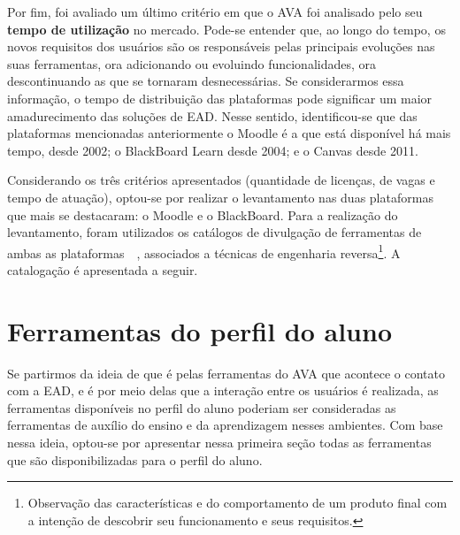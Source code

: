 
Por fim, foi avaliado um último critério em que o AVA foi analisado pelo seu \textbf{tempo de utilização} no mercado. Pode-se entender que, ao longo do tempo, os novos requisitos dos usuários são os responsáveis pelas principais evoluções nas suas ferramentas, ora adicionando ou evoluindo funcionalidades, ora descontinuando as que se tornaram desnecessárias. Se considerarmos essa informação, o tempo de distribuição das plataformas pode significar um maior amadurecimento das soluções de EAD. Nesse sentido, identificou-se que das plataformas mencionadas anteriormente o Moodle é a que está disponível há mais tempo, desde 2002; o BlackBoard Learn desde 2004; e o Canvas desde 2011.

Considerando os três critérios apresentados (quantidade de licenças, de vagas e tempo de atuação), optou-se por realizar o levantamento nas duas plataformas que mais se destacaram: o Moodle e o BlackBoard. Para a realização do levantamento, foram utilizados os catálogos de divulgação de ferramentas de ambas as plataformas~\cite{moodle}~\cite{bblearn}, associados a técnicas de engenharia reversa\footnote{Observação das características e do comportamento de um produto final com a intenção de descobrir seu funcionamento e seus requisitos.}. A catalogação é apresentada a seguir.
\section{Ferramentas do perfil do aluno}%
\label{sec:aprend}
Se partirmos da ideia de que é pelas ferramentas do AVA que acontece o contato com a EAD, e é por meio delas que a interação entre os usuários é realizada, as ferramentas disponíveis no perfil do aluno poderiam ser consideradas as ferramentas de auxílio do ensino e da aprendizagem nesses ambientes. Com base nessa ideia, optou-se por apresentar nessa primeira seção todas as ferramentas que são disponibilizadas para o perfil do aluno. 

